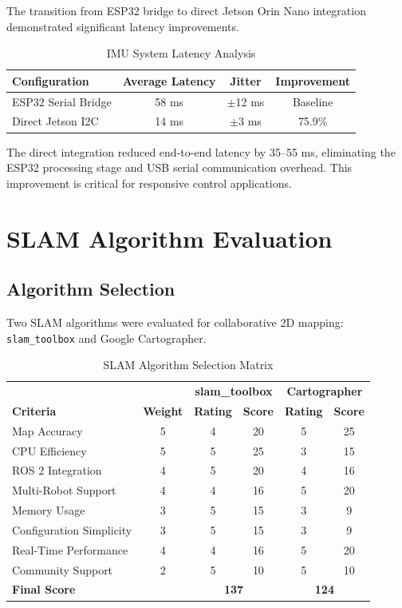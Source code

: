 The transition from ESP32 bridge to direct Jetson Orin Nano integration demonstrated significant latency improvements.

\begin{table}[H]
\centering
\caption{IMU System Latency Analysis}
\label{tab:imu_latency}
\begin{tabular}{|l|c|c|c|}
\hline
\textbf{Configuration} & \textbf{Average Latency} & \textbf{Jitter} & \textbf{Improvement} \\
\hline
ESP32 Serial Bridge & 58 ms & $\pm$12 ms & Baseline \\
Direct Jetson I2C & 14 ms & $\pm$3 ms & 75.9\% \\
\hline
\end{tabular}
\end{table}

The direct integration reduced end-to-end latency by 35--55 ms, eliminating the ESP32 processing stage and USB serial communication overhead. This improvement is critical for responsive control applications.

\section{SLAM Algorithm Evaluation}
\label{sec:slam_results}

\subsection{Algorithm Selection}

Two SLAM algorithms were evaluated for collaborative 2D mapping: \texttt{slam\_toolbox} and Google Cartographer.

\begin{table}[H]
\centering
\caption{SLAM Algorithm Selection Matrix}
\label{tab:slam_selection_results}
\begin{tabular}{|l|c|c|c|c|c|}
\hline
 & & \multicolumn{2}{c|}{\textbf{slam\_toolbox}} & \multicolumn{2}{c|}{\textbf{Cartographer}} \\
\textbf{Criteria} & \textbf{Weight} & \textbf{Rating} & \textbf{Score} & \textbf{Rating} & \textbf{Score} \\
\hline
Map Accuracy & 5 & 4 & 20 & 5 & 25 \\
CPU Efficiency & 5 & 5 & 25 & 3 & 15 \\
ROS 2 Integration & 4 & 5 & 20 & 4 & 16 \\
Multi-Robot Support & 4 & 4 & 16 & 5 & 20 \\
Memory Usage & 3 & 5 & 15 & 3 & 9 \\
Configuration Simplicity & 3 & 5 & 15 & 3 & 9 \\
Real-Time Performance & 4 & 4 & 16 & 5 & 20 \\
Community Support & 2 & 5 & 10 & 5 & 10 \\
\hline
\textbf{Final Score} & & \multicolumn{2}{c|}{\textbf{137}} & \multicolumn{2}{c|}{\textbf{124}} \\
\hline
\end{tabular}
\end{table}

